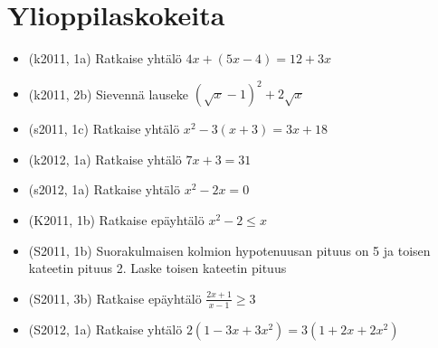 \chapter{Ylioppilaskokeita}

\begin{itemize}
  \item[] (k2011, 1a) Ratkaise yhtälö $4x+(5x-4) = 12+3x$
  \item[] (k2011, 2b) Sievennä lauseke $(\sqrt{x}-1)^2+2\sqrt{x}$
  \item[] (s2011, 1c) Ratkaise yhtälö $x^2-3(x+3) = 3x+18$
  \item[] (k2012, 1a) Ratkaise yhtälö $7x+3 = 31$
  \item[] (s2012, 1a) Ratkaise yhtälö $x^2-2x = 0$

  \item[] (K2011, 1b) Ratkaise epäyhtälö $x^2-2 \leq x$
  \item[] (S2011, 1b) Suorakulmaisen kolmion hypotenuusan pituus on 5
   ja toisen kateetin pituus 2. Laske toisen kateetin pituus
  \item[] (S2011, 3b) Ratkaise epäyhtälö $\frac{2x+1}{x-1} \geq 3$
  \item[] (S2012, 1a) Ratkaise yhtälö $2(1-3x+3x^2) = 3(1+2x+2x^2)$
\end{itemize}





